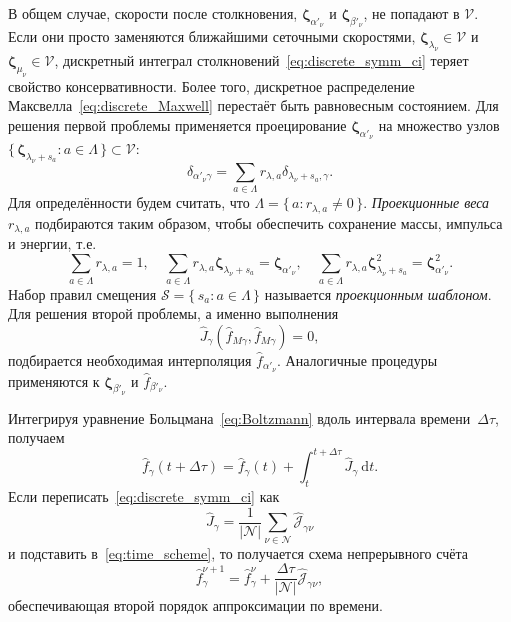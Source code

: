 \documentclass[a4paper,12pt]{article}
\newcommand{\dd}{\:\mathrm{d}}
\newcommand{\bzeta}{\boldsymbol{\zeta}}
\newcommand{\Nu}{\mathcal{N}}
\newcommand{\Set}[2]{\{\,{#1}:{#2}\,\}}
\begin{document}
В общем случае, скорости после столкновения,
\(\bzeta_{\alpha'_\nu}\) и \(\bzeta_{\beta'_\nu}\), не попадают в \(\mathcal{V}\).
Если они просто заменяются ближайшими сеточными скоростями,
\(\bzeta_{\lambda_\nu}\in\mathcal{V}\) и \(\bzeta_{\mu_\nu}\in\mathcal{V}\),
дискретный интеграл столкновений~\eqref{eq:discrete_symm_ci} теряет свойство консервативности.
Более того, дискретное распределение Максвелла~\eqref{eq:discrete_Maxwell} перестаёт быть равновесным состоянием.
Для решения первой проблемы применяется проецирование \(\bzeta_{\alpha'_\nu}\)
на множество узлов \(\Set{\bzeta_{\lambda_\nu+s_a}}{a\in\Lambda}\subset\mathcal{V}\):
\begin{equation}\label{eq:ci_projection}
    \delta_{\alpha'_\nu\gamma} = \sum_{a\in\Lambda} r_{\lambda,a}\delta_{\lambda_\nu+s_a,\gamma}.
\end{equation}
Для определённости будем считать, что \(\Lambda = \Set{a}{r_{\lambda,a}\neq0}\).
\emph{Проекционные веса} \(r_{\lambda,a}\) подбираются таким образом, чтобы обеспечить сохранение массы, импульса и энергии, т.е.
\begin{equation}\label{eq:stencil_conservation}
    \sum_{a\in\Lambda} r_{\lambda,a} = 1, \quad
    \sum_{a\in\Lambda} r_{\lambda,a} \bzeta_{\lambda_\nu+s_a} = \bzeta_{\alpha'_\nu}, \quad
    \sum_{a\in\Lambda} r_{\lambda,a} \bzeta_{\lambda_\nu+s_a}^2 = \bzeta_{\alpha'_\nu}^2.
\end{equation}
Набор правил смещения \(\mathcal{S} = \Set{s_a}{a\in\Lambda}\)
называется \emph{проекционным шаблоном}.
Для решения второй проблемы, а именно выполнения
\begin{equation}\label{eq:strict_interpolation}
    \hat{J}_\gamma(\hat{f}_{M\gamma}, \hat{f}_{M\gamma}) = 0,
\end{equation}
подбирается необходимая интерполяция \(\hat{f}_{\alpha'_\nu}\).
Аналогичные процедуры применяются к \(\bzeta_{\beta'_\nu}\) и \(\hat{f}_{\beta'_\nu}\).

Интегрируя уравнение Больцмана~\eqref{eq:Boltzmann} вдоль интервала времени~\(\Delta\tau\), получаем
\begin{equation}\label{eq:time_scheme}
    \hat{f}_\gamma(t+\Delta\tau) = \hat{f}_\gamma(t) + \int_t^{t+\Delta\tau} \hat{J}_\gamma \dd{t}.
\end{equation}
Если переписать~\eqref{eq:discrete_symm_ci} как
\begin{equation}\label{eq:discrete_short_ci}
    \hat{J}_\gamma = \frac1{|\Nu|}\sum_{\nu\in\Nu} \hat{\mathscr{J}}_{\gamma\nu}
\end{equation}
и подставить в~\eqref{eq:time_scheme}, то получается схема непрерывного счёта
\begin{equation}\label{eq:continuous_scheme}
   \hat{f}_\gamma^{\nu+1} = \hat{f}_\gamma^\nu + \frac{\Delta\tau}{|\Nu|}\hat{\mathscr{J}}_{\gamma\nu},
\end{equation}
обеспечивающая второй порядок аппроксимации по времени.
\end{document}
